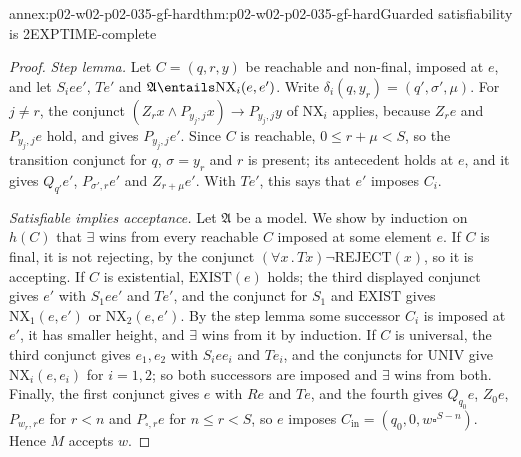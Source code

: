 \begin{annexitem}{annex:p02-w02-p02-035-gf-hard}{thm:p02-w02-p02-035-gf-hard}{Guarded satisfiability is 2EXPTIME-complete}
\begin{proof}
\emph{Step lemma.}  Let \(C=(q,r,y)\) be reachable and non-final, imposed at
\(e\), and let \(S_iee'\), \(Te'\) and \(\mathfrak A\entails\mathrm{NX}_i(e,e')\).
Write \(\delta_i(q,y_r)=(q',\sigma',\mu)\).  For \(j\neq r\), the conjunct
\((Z_rx\land P_{y_j,j}x)\to P_{y_j,j}y\) of \(\mathrm{NX}_i\) applies, because
\(Z_re\) and \(P_{y_j,j}e\) hold, and gives \(P_{y_j,j}e'\).  Since \(C\) is
reachable, \(0\leq r+\mu<S\), so the transition conjunct for \(q\),
\(\sigma=y_r\) and \(r\) is present; its antecedent holds at \(e\), and it
gives \(Q_{q'}e'\), \(P_{\sigma',r}e'\) and \(Z_{r+\mu}e'\).  With \(Te'\), this
says that \(e'\) imposes \(C_i\).

\emph{Satisfiable implies acceptance.}  Let \(\mathfrak A\) be a model.  We show
by induction on \(h(C)\) that \(\exists\) wins from every reachable \(C\)
imposed at some element \(e\).  If \(C\) is final, it is not rejecting, by
the conjunct \((\forall x\,.\,Tx)\neg\mathrm{REJECT}(x)\), so it is accepting.
If \(C\) is existential, \(\mathrm{EXIST}(e)\) holds; the third displayed
conjunct gives \(e'\) with \(S_1ee'\) and \(Te'\), and the conjunct for
\(S_1\) and \(\mathrm{EXIST}\) gives \(\mathrm{NX}_1(e,e')\) or
\(\mathrm{NX}_2(e,e')\).  By the step lemma some successor \(C_i\) is imposed
at \(e'\), it has smaller height, and \(\exists\) wins from it by induction.
If \(C\) is universal, the third conjunct gives \(e_1,e_2\) with \(S_iee_i\)
and \(Te_i\), and the conjuncts for \(\mathrm{UNIV}\) give
\(\mathrm{NX}_i(e,e_i)\) for \(i=1,2\); so both successors are imposed and
\(\exists\) wins from both.  Finally, the first conjunct gives \(e\) with
\(Re\) and \(Te\), and the fourth gives \(Q_{q_0}e\), \(Z_0e\),
\(P_{w_r,r}e\) for \(r<n\) and \(P_{\square,r}e\) for \(n\leq r<S\), so \(e\)
imposes \(C_{\mathrm{in}}=(q_0,0,w\square^{S-n})\).  Hence \(M\) accepts
\(w\).


\end{proof}
\end{annexitem}
